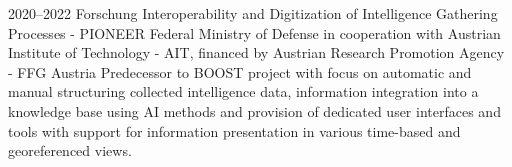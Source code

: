\cventry
{2020--2022}
{Forschung}
{Interoperability and Digitization of Intelligence Gathering Processes - PIONEER}
{
  Federal Ministry of Defense
  in cooperation with Austrian Institute of Technology - AIT,
  financed by Austrian Research Promotion Agency - FFG}
{Austria}
{
  Predecessor to BOOST project with focus on automatic and manual structuring
  collected intelligence data, information integration into a knowledge base
  using AI methods and provision of dedicated user interfaces and tools with
  support for information presentation in various time-based and georeferenced views.
}
